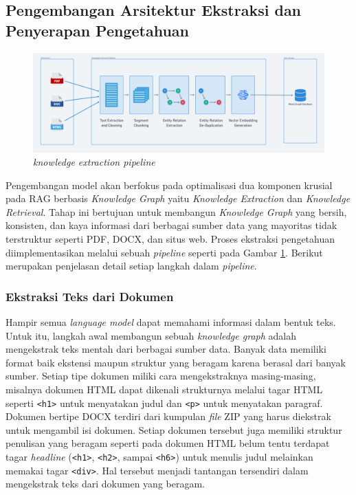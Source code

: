 \subsection{Pengembangan Arsitektur Ekstraksi dan Penyerapan Pengetahuan}

\begin{figure}[H]
	\centering
	\includegraphics[width=1\textwidth]{images/knowledge-extraction-flow.png}
	\caption{
		\textit{knowledge extraction pipeline}
	}
	\label{fig:knowledge-extraction-pipeline}
\end{figure}

Pengembangan model akan berfokus pada optimalisasi dua komponen krusial pada RAG berbasis \textit{Knowledge Graph} yaitu \textit{Knowledge Extraction} dan \textit{Knowledge Retrieval}.
Tahap ini bertujuan untuk membangun \textit{Knowledge Graph} yang bersih, konsisten, dan kaya informasi dari berbagai sumber data yang mayoritas tidak terstruktur seperti PDF, DOCX, dan situs web.
Proses ekstraksi pengetahuan diimplementasikan melalui sebuah \textit{pipeline} seperti pada Gambar \ref{fig:knowledge-extraction-pipeline}.
Berikut merupakan penjelasan detail setiap langkah dalam \textit{pipeline}.

\subsubsection{Ekstraksi Teks dari Dokumen}
Hampir semua \textit{language model} dapat memahami informasi dalam bentuk teks.
Untuk itu, langkah awal membangun sebuah \textit{knowledge graph} adalah mengekstrak teks mentah dari berbagai sumber data.
Banyak data memiliki format baik ekstensi maupun struktur yang beragam karena berasal dari banyak sumber.
Setiap tipe dokumen miliki cara mengekstraknya masing-masing, misalnya dokumen HTML dapat dikenali strukturnya melalui tagar HTML seperti \texttt{<h1>} untuk menyatakan judul dan \texttt{<p>} untuk menyatakan paragraf.
Dokumen bertipe DOCX terdiri dari kumpulan \textit{file} ZIP yang harus diekstrak untuk mengambil isi dokumen.
Setiap dokumen tersebut juga memiliki struktur penulisan yang beragam seperti pada dokumen HTML belum tentu terdapat tagar \textit{headline} (\texttt{<h1>}, \texttt{<h2>}, sampai \texttt{<h6>}) untuk menulis judul melainkan memakai tagar \texttt{<div>}.
Hal tersebut menjadi tantangan tersendiri dalam mengekstrak teks dari dokumen yang beragam.

